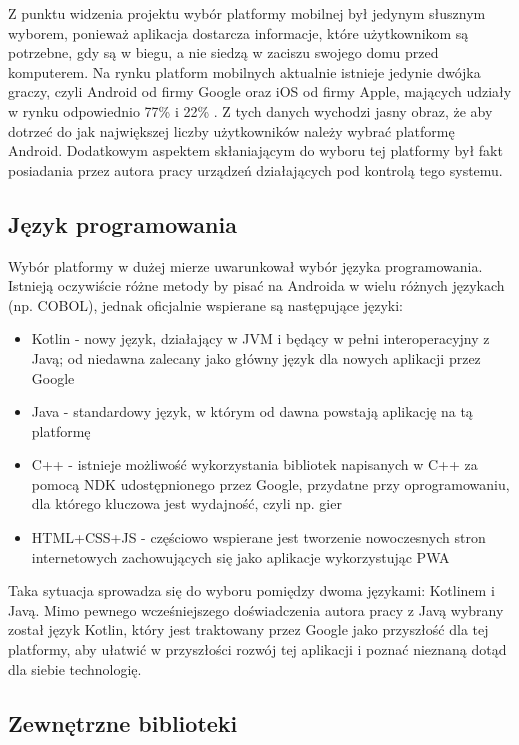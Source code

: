\documentclass[polish,polish,a4paper,12pt]{article}
\begin{document}
	Z punktu widzenia projektu wybór platformy mobilnej był jedynym słusznym wyborem, ponieważ aplikacja dostarcza informacje, które użytkownikom są potrzebne, gdy są w biegu, a nie siedzą w zaciszu swojego domu przed komputerem. Na rynku platform mobilnych aktualnie istnieje jedynie dwójka graczy, czyli Android od firmy Google oraz iOS od firmy Apple, mających udziały w rynku odpowiednio 77\% i 22\% \cite{mobilemarketshare}. Z tych danych wychodzi jasny obraz, że aby dotrzeć do jak największej liczby użytkowników należy wybrać platformę Android. Dodatkowym aspektem skłaniającym do wyboru tej platformy był fakt posiadania przez autora pracy urządzeń działających pod kontrolą tego systemu.

	\subsection{Język programowania}

	Wybór platformy w dużej mierze uwarunkował wybór języka programowania. Istnieją oczywiście różne metody by pisać na Androida w wielu różnych językach (np. COBOL), jednak oficjalnie wspierane są następujące języki:

	\begin{itemize}
		\item Kotlin - nowy język, działający w JVM i będący w pełni interoperacyjny z Javą; od niedawna zalecany jako główny język dla nowych aplikacji przez Google
		\item Java - standardowy język, w którym od dawna powstają aplikację na tą platformę
		\item C++ - istnieje możliwość wykorzystania bibliotek napisanych w C++ za pomocą NDK udostępnionego przez Google, przydatne przy oprogramowaniu, dla którego kluczowa jest wydajność, czyli np. gier
		\item HTML+CSS+JS - częściowo wspierane jest tworzenie nowoczesnych stron internetowych zachowujących się jako aplikacje wykorzystując PWA
	\end{itemize}

	Taka sytuacja sprowadza się do wyboru pomiędzy dwoma językami: Kotlinem i Javą. Mimo pewnego wcześniejszego doświadczenia autora pracy z Javą wybrany został język Kotlin, który jest traktowany przez Google jako przyszłość dla tej platformy, aby ułatwić w przyszłości rozwój tej aplikacji i poznać nieznaną dotąd dla siebie technologię.

	\subsection{Zewnętrzne biblioteki}
\end{document}
